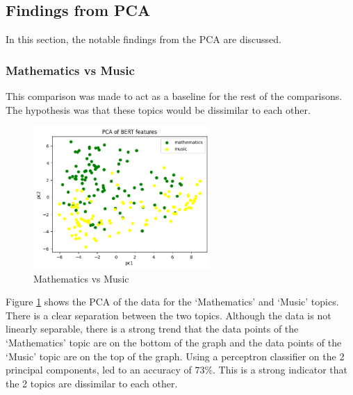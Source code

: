 \subsection{Findings from PCA}
In this section, the notable findings from the PCA are discussed.
\subsubsection{Mathematics vs Music}
This comparison was made to act as a baseline for the rest of the comparisons. The hypothesis was that these topics would be
dissimilar to each other.
\begin{figure}
    \centering
    \includegraphics[width=0.6\textwidth]{../images/math-vs-music.png}
    \caption{Mathematics vs Music}
    \label{fig:math-vs-music}
\end{figure}

Figure \ref{fig:math-vs-music} shows the PCA of the data for the `Mathematics' and `Music' topics. There is a clear separation between
the two topics. Although the data is not linearly separable, there is a strong trend that the data points of the `Mathematics' topic
are on the bottom of the graph and the data points of the `Music' topic are on the top of the graph. Using a perceptron classifier
on the 2 principal components, led to an accuracy of $73\%$. This is a strong indicator that the 2 topics are dissimilar to each other.
